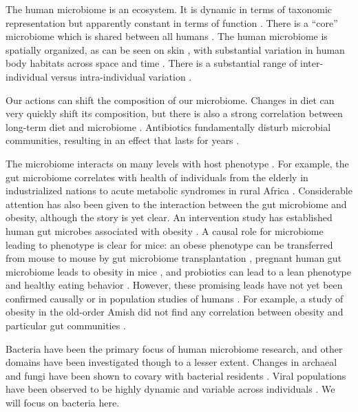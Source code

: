 \documentclass{amsart}
\begin{document}
The human microbiome is an ecosystem.
It is dynamic in terms of taxonomic representation but apparently constant in terms of function \citep{hmp2012structure}.
There is a ``core'' microbiome which is shared between all humans \citep{turnbaugh2008core}.
The human microbiome is spatially organized, as can be seen on skin \citep{grice2009topographical}, with substantial variation in human body habitats across space and time \citep{costello2009bacterial}.
There is a substantial range of inter-individual versus intra-individual variation \citep{hmp2012structure}.

Our actions can shift the composition of our microbiome.
Changes in diet can very quickly shift its composition, but there is also a strong correlation between long-term diet and microbiome \citep{li2009human,wu2011linking}.
Antibiotics fundamentally disturb microbial communities, resulting in an effect that lasts for years \citep{jernberg2007long,dethlefsen2008pervasive,jakobsson2010short,dethlefsen2011incomplete}.

The microbiome interacts on many levels with host phenotype \citep[reviewed in][]{cho2012human}.
For example, the gut microbiome correlates with health of individuals from the elderly in industrialized nations \citep{claesson2012gut} to acute metabolic syndromes in rural Africa \citep{smith2013gut}.
Considerable attention has also been given to the interaction between the gut microbiome and obesity, although the story is yet clear.
An intervention study has established human gut microbes associated with obesity \citep{ley2006microbial}.
A causal role for microbiome leading to phenotype is clear for mice: an obese phenotype can be transferred from mouse to mouse by gut microbiome transplantation \citep{turnbaugh2006obesity}, pregnant human gut microbiome leads to obesity in mice \citep{koren2012host}, and probiotics can lead to a lean phenotype and healthy eating behavior \citep{poutahidis2013microbial}.
However, these promising leads have not yet been confirmed causally or in population studies of humans \citep{zhao2013gut}.
For example, a study of obesity in the old-order Amish did not find any correlation between obesity and particular gut communities \citep{zupancic2012analysis}.

Bacteria have been the primary focus of human microbiome research, and other domains have been investigated though to a lesser extent.
Changes in archaeal and fungi have been shown to covary with bacterial residents \citep{hoffmann2013archaea}.
Viral populations have been observed to be highly dynamic and variable across individuals \citep{reyes2010viruses,minot2011human,minot2013rapid}.
We will focus on bacteria here.
\end{document}
